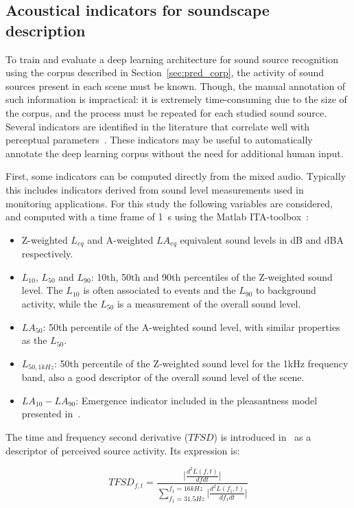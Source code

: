 \documentclass[twocolumn]{article}
\begin{document}
\subsection{Acoustical indicators for soundscape description}
\label{sec:pred_inds}

To train and evaluate a deep learning architecture for sound source recognition using the corpus described in Section~\ref{sec:pred_corp}, the activity of sound sources present in each scene must be known. Though, the manual annotation of such information is impractical: it is extremely time-consuming due to the size of the corpus, and the process must be repeated for each studied sound source. Several indicators are identified in the literature that correlate well with perceptual parameters~\cite{aumond2017, gontier2018, ricciardi2014}. These indicators may be useful to automatically annotate the deep learning corpus without the need for additional human input.

First, some indicators can be computed directly from the mixed audio. Typically this includes indicators derived from sound level measurements used in monitoring applications. For this study the following variables are considered, and computed with a time frame of 1~s using the Matlab ITA-toolbox~\cite{itatoolbox2017}:
\begin{itemize}
\item Z-weighted $L_{eq}$ and A-weighted $LA_{eq}$ equivalent sound levels in dB and dBA respectively.
\item $L_{10}$, $L_{50}$ and $L_{90}$: 10th, 50th and 90th percentiles of the Z-weighted sound level. The $L_{10}$ is often associated to events and the $L_{90}$ to background activity, while the $L_{50}$ is a measurement of the overall sound level.
\item $LA_{50}$: 50th percentile of the A-weighted sound level, with similar properties as the $L_{50}$.
\item $L_{50, 1kHz}$: 50th percentile of the Z-weighted sound level for the 1kHz frequency band, also a good descriptor of the overall sound level of the scene.
\item $LA_{10}-LA_{90}$: Emergence indicator included in the pleasantness model presented in~\cite{ricciardi2014}.
\end{itemize}
The time and frequency second derivative ($TFSD$) is introduced in~\cite{aumond2017} as a descriptor of perceived source activity. Its expression is:

\begin{equation}
TFSD_{f, t} = \frac{\lvert\frac{d^2L(f, t)}{dfdt}\rvert}{\sum_{f_1=31.5Hz}^{f_1=16kHz}\lvert\frac{d^2L(f_1, t)}{df_1dt}\rvert}
\end{equation}
\end{document}
